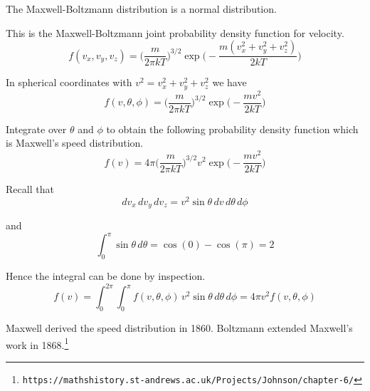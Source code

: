 \documentclass[12pt]{article}
\begin{document}
The Maxwell-Boltzmann distribution is a normal distribution.

\bigskip
This is the Maxwell-Boltzmann joint probability density function for velocity.
\begin{equation*}
f(v_x,v_y,v_z)=
\bigg(\frac{m}{2\pi kT}\bigg)^{3/2}
\exp\bigg({-}\frac{m(v_x^2+v_y^2+v_z^2)}{2kT}\bigg)
\end{equation*}

In spherical coordinates with $v^2=v_x^2+v_y^2+v_z^2$ we have
\begin{equation*}
f(v,\theta,\phi)=
\bigg(\frac{m}{2\pi kT}\bigg)^{3/2}
\exp\bigg({-}\frac{mv^2}{2kT}\bigg)
\end{equation*}

Integrate over $\theta$ and $\phi$
to obtain the following probability density function
which is Maxwell's speed distribution.
\begin{equation*}
f(v)=4\pi\bigg(\frac{m}{2\pi kT}\bigg)^{3/2}
v^2\exp\bigg({-}\frac{mv^2}{2kT}\bigg)
\end{equation*}

Recall that
\begin{equation*}
dv_x\,dv_y\,dv_z=v^2\sin\theta\,dv\,d\theta\,d\phi
\end{equation*}

and
\begin{equation*}
\int_0^\pi\sin\theta\,d\theta=\cos(0)-\cos(\pi)=2
\end{equation*}

Hence the integral can be done by inspection.
\begin{equation*}
f(v)=\int_0^{2\pi}\int_0^\pi f(v,\theta,\phi)\,v^2\sin\theta\,d\theta\,d\phi
=4\pi v^2f(v,\theta,\phi)
\end{equation*}

Maxwell derived the speed distribution in 1860.
Boltzmann extended Maxwell's work in 1868.\footnote{
\tt https://mathshistory.st-andrews.ac.uk/Projects/Johnson/chapter-6/}
\end{document}
